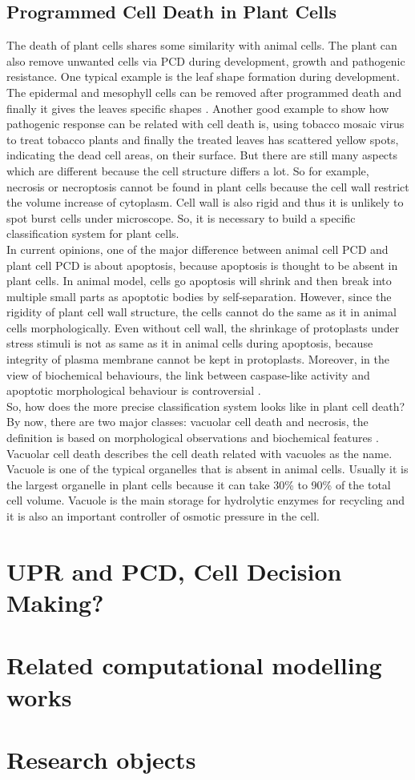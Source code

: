 \subsection{Programmed Cell Death in Plant Cells}
The death of plant cells shares some similarity with animal cells. The plant can also remove unwanted cells via PCD during development, growth and pathogenic resistance. One typical example is the leaf shape formation during development. The epidermal and mesophyll cells can be removed after programmed death and finally it gives the leaves specific shapes \citep{gunawardena2004programmed}. Another good example to show how pathogenic response can be related with cell death is, using tobacco mosaic virus to treat tobacco plants and finally the treated leaves has scattered yellow spots, indicating the dead cell areas, on their surface. But there are still many aspects which are different because the cell structure differs a lot. So for example, necrosis or necroptosis cannot be found in plant cells because the cell wall restrict the volume increase of cytoplasm. Cell wall is also rigid and thus it is unlikely to spot burst cells under microscope. So, it is necessary to build a specific classification system for plant cells. \\
In current opinions, one of the major difference between animal cell PCD and plant cell PCD is about apoptosis, because apoptosis is thought to be absent in plant cells. In animal model, cells go apoptosis will shrink and then break into multiple small parts as apoptotic bodies by self-separation. However, since the rigidity of plant cell wall structure, the cells cannot do the same as it in animal cells morphologically. Even without cell wall, the shrinkage of protoplasts under stress stimuli is not as same as it in animal cells during apoptosis, because integrity of plasma membrane cannot be kept in protoplasts. Moreover, in the view of biochemical behaviours, the link between caspase-like activity and apoptotic morphological behaviour is controversial  \citep{van2011morphological}. \\
So, how does the more precise classification system looks like in plant cell death? By now, there are two major classes: vacuolar cell death and necrosis, the definition is based on morphological observations and biochemical features \citep{van2011morphological}.\\
Vacuolar cell death describes the cell death related with vacuoles as the name. Vacuole is one of the typical organelles that is absent in animal cells. Usually it is the largest organelle in plant cells because it can take 30\% to 90\% of the total cell volume. Vacuole is the main storage for hydrolytic enzymes for recycling and it is also an important controller of osmotic pressure in the cell.  
\section{UPR and PCD, Cell Decision Making?}
\section{Related computational modelling works}
\section{Research objects}